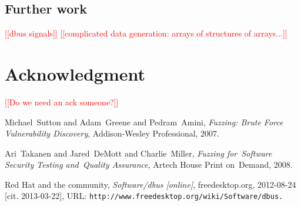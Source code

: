 \documentclass[conference]{IEEEtran}
\newcommand{\addtodo}[1]{\textcolor{red}{[[#1]]}}
\begin{document}
\subsection{Further work}
\addtodo{dbus signals}
\addtodo{complicated data generation: arrays of structures of arrays...}

\section*{Acknowledgment}
\addtodo{Do we need an ack someone?}




%
%
%
\begin{thebibliography}{1}

Michael~Sutton and Adam~Greene and Pedram~Amini, \emph{Fuzzing: Brute Force
Vulnerability Discovery}, Addison-Wesley Professional, 2007.

Ari~Takanen and Jared~DeMott and Charlie~Miller, \emph{Fuzzing for~Software
Security Testing and~Quality Assurance}, Artech House Print on~Demand, 2008.

Red Hat and the community, \emph{Software/dbus [online]}, freedesktop.org,
2012-08-24 [cit. 2013-03-22], URL: \tt http://www.freedesktop.org/wiki/Software/dbus.

\end{thebibliography}

\end{document}
